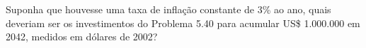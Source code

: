 Suponha que houvesse uma taxa de infla\c{c}\~ao constante de 3\% ao ano, quais deveriam ser os investimentos do Problema 5.40 para acumular US\$ 1.000.000 em 2042, medidos em d\'olares de 2002?
